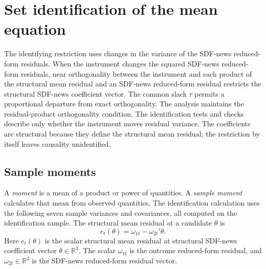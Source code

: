 \documentclass[11pt]{article}
\begin{document}
\section{Set identification of the mean equation}
\label{sec:idset}

The identifying restriction uses changes in the variance of the SDF-news reduced-form residuals.
When the instrument changes the
squared SDF-news reduced-form residuals, near orthogonality between the instrument and each product
of the structural mean residual and an SDF-news reduced-form residual restricts the structural
SDF-news coefficient vector. The common slack \(\tau\) permits a proportional departure from exact
orthogonality. The analysis maintains the residual-product orthogonality condition. The identification
tests and checks describe only whether the instrument moves residual variance. The coefficients are
structural because they define the structural mean residual; the restriction by itself leaves
causality unidentified.

\subsection{Sample moments}

A \emph{moment} is a mean of a product or power of quantities. A \emph{sample moment} calculates
that mean from observed quantities. The identification calculation uses the following seven sample
variances and covariances, all computed on the identification sample.
The structural mean residual at a candidate \(\theta\) is
\begin{equation}
 e_t(\theta)=\omega_{1t}-\omega_{2t}'\theta.
 \label{eq:mean-residual}
\end{equation}
Here \(e_t(\theta)\) is the scalar structural mean residual at structural SDF-news coefficient
vector \(\theta\in\mathbb R^3\). The scalar \(\omega_{1t}\) is the outcome reduced-form residual, and
\(\omega_{2t}\in\mathbb R^3\) is the SDF-news reduced-form residual vector.
\end{document}
